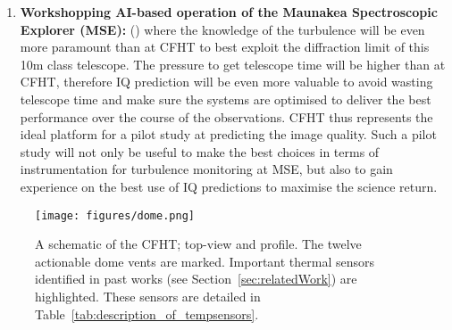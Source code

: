 \begin{enumerate}
    \item \textbf{Workshopping AI-based operation of the Maunakea Spectroscopic Explorer (MSE):} () where the knowledge of the turbulence will be even more paramount than at CFHT to best exploit the diffraction limit of this 10m class telescope. The pressure to get telescope time will be higher than at CFHT, therefore IQ prediction will be even more valuable to avoid wasting telescope time and make sure the systems are optimised to deliver the best performance over the course of the observations. CFHT thus represents the ideal platform for a pilot study at predicting the image quality. Such a pilot study will not only be useful to make the best choices in terms of instrumentation for turbulence monitoring at MSE, but also to gain experience on the best use of IQ predictions to maximise the science return.
\end{enumerate}
\fi

\begin{figure*}
   \centering
   \texttt{[image: figures/dome.png]}
   \caption{A schematic of the CFHT; top-view and profile. The twelve actionable dome vents are marked.  Important thermal sensors identified in past works (see Section~\ref{sec:relatedWork}) are highlighted. These sensors are detailed in Table~\ref{tab:description_of_tempsensors}.}
   \label{fig:dome}
\end{figure*}




